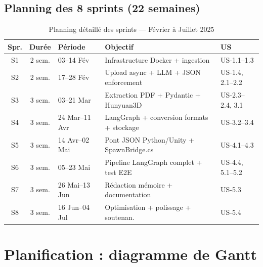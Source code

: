 \documentclass[12pt,a4paper,oneside]{report}
\newcommand{\theadrow}{\rowcolor{tekupblue!12}}
\begin{document}
\subsection{Planning des 8 sprints (22 semaines)}

\begin{table}[H]
\centering
\caption{Planning détaillé des sprints --- Février à Juillet 2025}
\label{tab:sprints}
\begin{tabularx}{\linewidth}{@{}cclXl@{}}
\toprule
\theadrow
\textbf{Spr.} & \textbf{Durée} & \textbf{Période} & \textbf{Objectif} & \textbf{US} \\
\midrule
S1 & 2 sem. & 03--14 Fév & Infrastructure Docker + ingestion       & US-1.1--1.3 \\
S2 & 2 sem. & 17--28 Fév & Upload async + LLM + JSON enforcement   & US-1.4, 2.1--2.2 \\
S3 & 3 sem. & 03--21 Mar & Extraction PDF + Pydantic + Hunyuan3D  & US-2.3--2.4, 3.1 \\
S4 & 3 sem. & 24 Mar--11 Avr & LangGraph + conversion formats + stockage & US-3.2--3.4 \\
S5 & 3 sem. & 14 Avr--02 Mai & Pont JSON Python/Unity + SpawnBridge.cs & US-4.1--4.3 \\
S6 & 3 sem. & 05--23 Mai & Pipeline LangGraph complet + test E2E   & US-4.4, 5.1--5.2 \\
S7 & 3 sem. & 26 Mai--13 Jun & Rédaction mémoire + documentation  & US-5.3 \\
S8 & 3 sem. & 16 Jun--04 Jul & Optimisation + polissage + soutenan. & US-5.4 \\
\bottomrule
\end{tabularx}
\end{table}


\section{Planification : diagramme de Gantt}
\label{sec:gantt}
\end{document}
